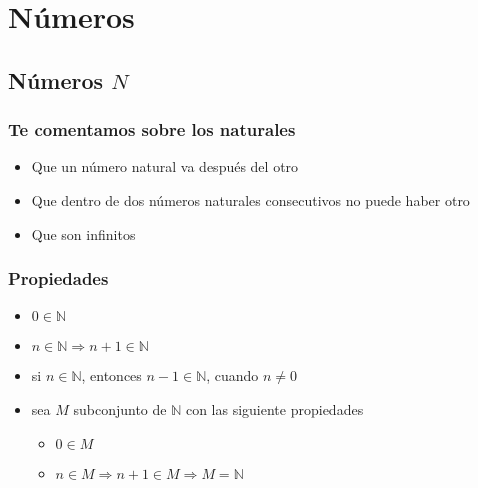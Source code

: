\section{Números}
   \subsection{N\'umeros $N$}
   \subsubsection{Te comentamos sobre los naturales}
      
      \begin{itemize}
	 \item Que un número natural va después del otro
	 \item Que dentro de dos números naturales consecutivos no puede haber otro
	 \item Que son infinitos
      \end{itemize}

   \subsubsection{Propiedades}
      \begin{itemize}
       \item $0 \in \mathbb{N} $
      \item $n \in \mathbb{N} \Rightarrow n+1 \in \mathbb{N}$
      \item si $n \in \mathbb{N}$, entonces $n-1 \in \mathbb{N}$, cuando $n \neq 0$
      \item sea $M$ subconjunto de $\mathbb{N}$ con las siguiente propiedades
	 \begin{itemize}
	 \item $0 \in M$
	 \item $n \in M \Rightarrow n+1 \in M \Rightarrow M=\mathbb{N} $ 
	 \end{itemize}
      \end{itemize}

